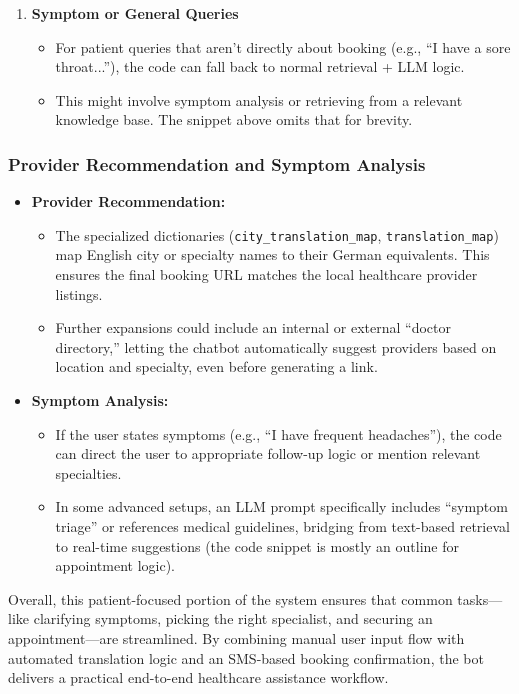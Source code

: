 \begin{enumerate}
    \item \textbf{Symptom or General Queries}
    \begin{itemize}
        \item For patient queries that aren’t directly about booking (e.g., “I have a sore throat...”), the code can fall back to normal retrieval + LLM logic.
        \item This might involve symptom analysis or retrieving from a relevant knowledge base. The snippet above omits that for brevity.
    \end{itemize}
\end{enumerate}

\subsubsection*{Provider Recommendation and Symptom Analysis}

\begin{itemize}
    \item \textbf{Provider Recommendation:}
    \begin{itemize}
        \item The specialized dictionaries (\texttt{city\_translation\_map}, \texttt{translation\_map}) map English city or specialty names to their German equivalents. This ensures the final booking URL matches the local healthcare provider listings.
        \item Further expansions could include an internal or external “doctor directory,” letting the chatbot automatically suggest providers based on location and specialty, even before generating a link.
    \end{itemize}
    \item \textbf{Symptom Analysis:}
    \begin{itemize}
        \item If the user states symptoms (e.g., “I have frequent headaches”), the code can direct the user to appropriate follow-up logic or mention relevant specialties.  
        \item In some advanced setups, an LLM prompt specifically includes “symptom triage” or references medical guidelines, bridging from text-based retrieval to real-time suggestions (the code snippet is mostly an outline for appointment logic).
    \end{itemize}
\end{itemize}

\noindent
Overall, this patient-focused portion of the system ensures that common tasks—like clarifying symptoms, picking the right specialist, and securing an appointment—are streamlined. By combining manual user input flow with automated translation logic and an SMS-based booking confirmation, the bot delivers a practical end-to-end healthcare assistance workflow.

